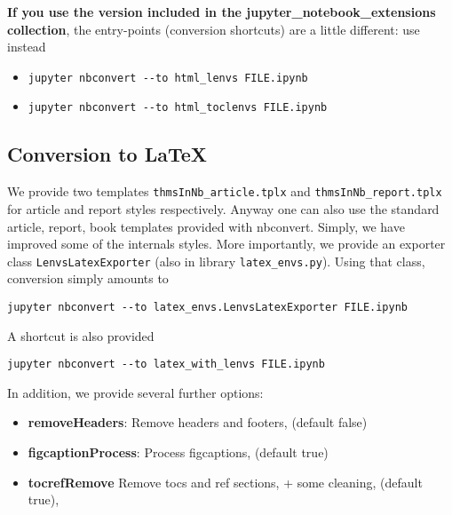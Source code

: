 \textbf{If you use the version included in the
jupyter\_notebook\_extensions collection}, the entry-points (conversion
shortcuts) are a little different: use instead

\begin{itemize}
\item
\begin{verbatim}
jupyter nbconvert --to html_lenvs FILE.ipynb
\end{verbatim}
\item
\begin{verbatim}
jupyter nbconvert --to html_toclenvs FILE.ipynb
\end{verbatim}
\end{itemize}

\subsection{Conversion to LaTeX}\label{conversion-to-latex}

We provide two templates \texttt{thmsInNb\_article.tplx} and
\texttt{thmsInNb\_report.tplx} for article and report styles
respectively. Anyway one can also use the standard article, report, book
templates provided with nbconvert. Simply, we have improved some of the
internals styles. More importantly, we provide an exporter class
\texttt{LenvsLatexExporter} (also in library \texttt{latex\_envs.py}).
Using that class, conversion simply amounts to

\begin{verbatim}
jupyter nbconvert --to latex_envs.LenvsLatexExporter FILE.ipynb
\end{verbatim}

A shortcut is also provided

\begin{verbatim}
jupyter nbconvert --to latex_with_lenvs FILE.ipynb
\end{verbatim}

In addition, we provide several further options:

\begin{itemize}
\tightlist
\item
  \textbf{removeHeaders}: Remove headers and footers, (default false)
\item
  \textbf{figcaptionProcess}: Process figcaptions, (default true)
\item
  \textbf{tocrefRemove} Remove tocs and ref sections, + some cleaning,
  (default true),
\end{itemize}

